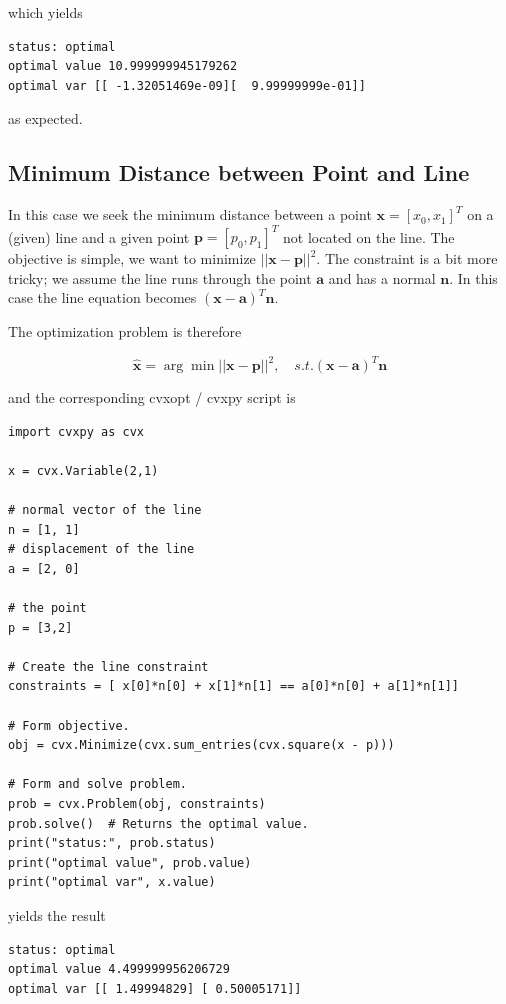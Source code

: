 which yields

\begin{verbatim}
status: optimal
optimal value 10.999999945179262
optimal var [[ -1.32051469e-09][  9.99999999e-01]]
\end{verbatim}

as expected.

\subsection{Minimum Distance between Point and Line}

In this case we seek the minimum distance between a point \(\mathbf{x}=[x_0, x_1]^T\) on a (given) line and a given point \(\mathbf{p} = [p_0, p_1]^T\) not located on the line. The objective is simple, we want to minimize \(||\mathbf{x} - \mathbf{p}||^2\). The constraint is a bit more tricky; we assume the line runs through the point \(\mathbf{a}\) and has a normal \(\mathbf{n}\). In this case the line equation becomes \((\mathbf{x}-\mathbf{a})^T \mathbf{n}\).

The optimization problem is therefore

\[
\hat{\mathbf{x}} = \arg \min || \mathbf{x} - \mathbf{p} ||^2, \quad s.t. (\mathbf{x}-\mathbf{a})^T \mathbf{n}
\]

and the corresponding cvxopt / cvxpy script is

\begin{verbatim}
import cvxpy as cvx

x = cvx.Variable(2,1)

# normal vector of the line
n = [1, 1]
# displacement of the line
a = [2, 0]

# the point
p = [3,2]

# Create the line constraint
constraints = [ x[0]*n[0] + x[1]*n[1] == a[0]*n[0] + a[1]*n[1]]

# Form objective.
obj = cvx.Minimize(cvx.sum_entries(cvx.square(x - p)))

# Form and solve problem.
prob = cvx.Problem(obj, constraints)
prob.solve()  # Returns the optimal value.
print("status:", prob.status)
print("optimal value", prob.value)
print("optimal var", x.value)
\end{verbatim}

yields the result

\begin{verbatim}
status: optimal
optimal value 4.499999956206729
optimal var [[ 1.49994829] [ 0.50005171]]
\end{verbatim}

